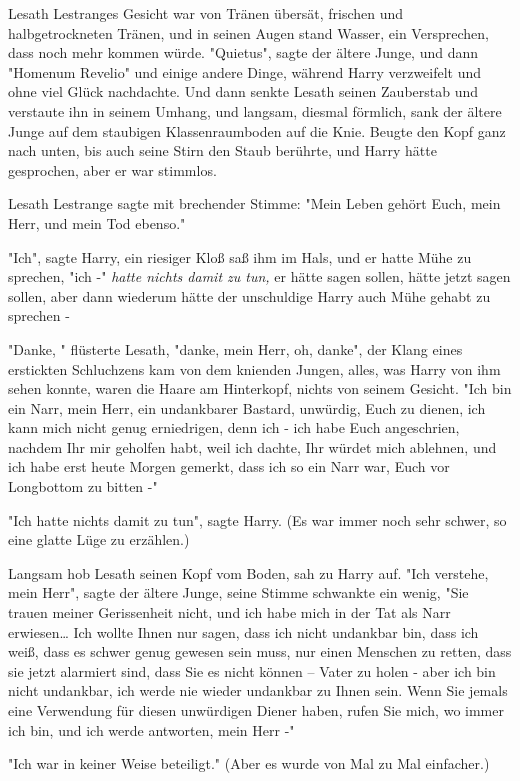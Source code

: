 {Lesath Lestranges Gesicht war von Tränen übersät, frischen und halbgetrockneten Tränen, und in seinen Augen stand Wasser, ein Versprechen, dass noch mehr kommen würde. "Quietus", sagte der ältere Junge, und dann "Homenum Revelio" und einige andere Dinge, während Harry verzweifelt und ohne viel Glück nachdachte. Und dann senkte Lesath seinen Zauberstab und verstaute ihn in seinem Umhang, und langsam, diesmal förmlich, sank der ältere Junge auf dem staubigen Klassenraumboden auf die Knie. Beugte den Kopf ganz nach unten, bis auch seine Stirn den Staub berührte, und Harry hätte gesprochen, aber er war stimmlos.

Lesath Lestrange sagte mit brechender Stimme: "Mein Leben gehört Euch, mein Herr, und mein Tod ebenso."

"Ich", sagte Harry, ein riesiger Kloß saß ihm im Hals, und er hatte Mühe zu sprechen, "ich -" \emph{hatte nichts damit zu tun,} er hätte sagen sollen, hätte jetzt sagen sollen, aber dann wiederum hätte der unschuldige Harry auch Mühe gehabt zu sprechen -

"Danke, " flüsterte Lesath, "danke, mein Herr, oh, danke", der Klang eines erstickten Schluchzens kam von dem knienden Jungen, alles, was Harry von ihm sehen konnte, waren die Haare am Hinterkopf, nichts von seinem Gesicht. "Ich bin ein Narr, mein Herr, ein undankbarer Bastard, unwürdig, Euch zu dienen, ich kann mich nicht genug erniedrigen, denn ich - ich habe Euch angeschrien, nachdem Ihr mir geholfen habt, weil ich dachte, Ihr würdet mich ablehnen, und ich habe erst heute Morgen gemerkt, dass ich so ein Narr war, Euch vor Longbottom zu bitten -"

"Ich hatte nichts damit zu tun", sagte Harry. (Es war immer noch sehr schwer, so eine glatte Lüge zu erzählen.)

Langsam hob Lesath seinen Kopf vom Boden, sah zu Harry auf. "Ich verstehe, mein Herr", sagte der ältere Junge, seine Stimme schwankte ein wenig, "Sie trauen meiner Gerissenheit nicht, und ich habe mich in der Tat als Narr erwiesen… Ich wollte Ihnen nur sagen, dass ich nicht undankbar bin, dass ich weiß, dass es schwer genug gewesen sein muss, nur einen Menschen zu retten, dass sie jetzt alarmiert sind, dass Sie es nicht können -- Vater zu holen - aber ich bin nicht undankbar, ich werde nie wieder undankbar zu Ihnen sein. Wenn Sie jemals eine Verwendung für diesen unwürdigen Diener haben, rufen Sie mich, wo immer ich bin, und ich werde antworten, mein Herr -"

"Ich war in keiner Weise beteiligt." (Aber es wurde von Mal zu Mal einfacher.)

}
